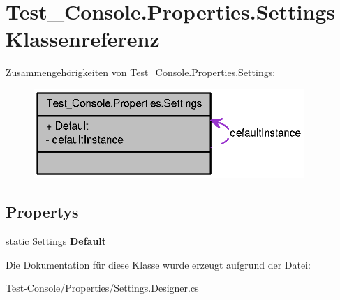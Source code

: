 \hypertarget{class_test___console_1_1_properties_1_1_settings}{
\section{Test\_\-Console.Properties.Settings Klassenreferenz}
\label{class_test___console_1_1_properties_1_1_settings}
}


Zusammengehörigkeiten von Test\_\-Console.Properties.Settings:\nopagebreak
\begin{figure}[H]
\begin{center}
\leavevmode
\includegraphics[width=290pt]{class_test___console_1_1_properties_1_1_settings__coll__graph}
\end{center}
\end{figure}
\subsection*{Propertys}
\begin{DoxyCompactItemize}
\item 
\hypertarget{class_test___console_1_1_properties_1_1_settings_a1c34923f97343187a84e157058e79b76}{
static \hyperlink{class_test___console_1_1_properties_1_1_settings}{Settings} {\bfseries Default}}
\label{class_test___console_1_1_properties_1_1_settings_a1c34923f97343187a84e157058e79b76}

\end{DoxyCompactItemize}


Die Dokumentation für diese Klasse wurde erzeugt aufgrund der Datei:\begin{DoxyCompactItemize}
\item 
Test-\/Console/Properties/Settings.Designer.cs\end{DoxyCompactItemize}
